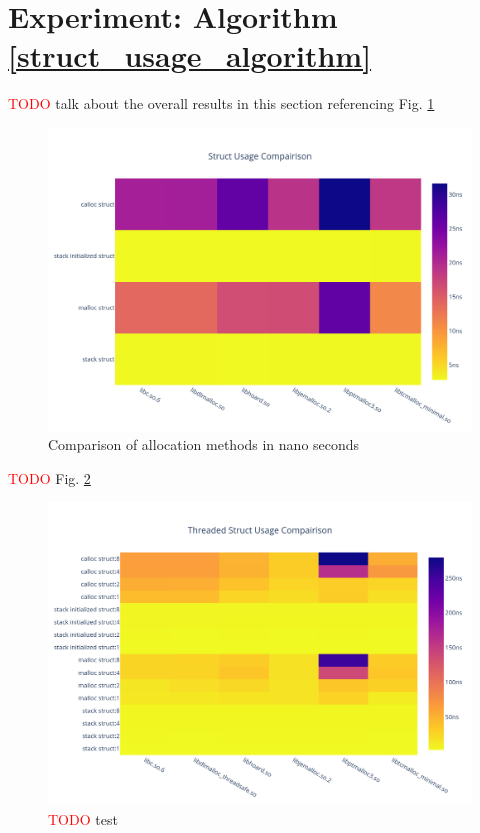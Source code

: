 \documentclass[letterpaper, 10 pt, conference]{ieeeconf}  %
\newcommand*\todo[0]{\textcolor{red}{TODO }}
\begin{document}
\section{Experiment: Algorithm \ref{struct_usage_algorithm}}

\todo talk about the overall results in this section referencing Fig. \ref{algo2_complete_hist}

\begin{figure}[tbh!]
  \centering
  \includegraphics[width=\columnwidth]{graphs/struct_hist.png}
  \caption{ Comparison of allocation methods in nano seconds }
  \label{algo2_complete_hist}
\end{figure} 

\todo Fig. \ref{algo2_complete_threaded_hist}

\begin{figure}[tbh!]
  \centering
  \includegraphics[width=\columnwidth]{graphs/struct_threaded_hist.png}
  \caption{ \todo  test}
  \label{algo2_complete_threaded_hist}
\end{figure}
\end{document}
